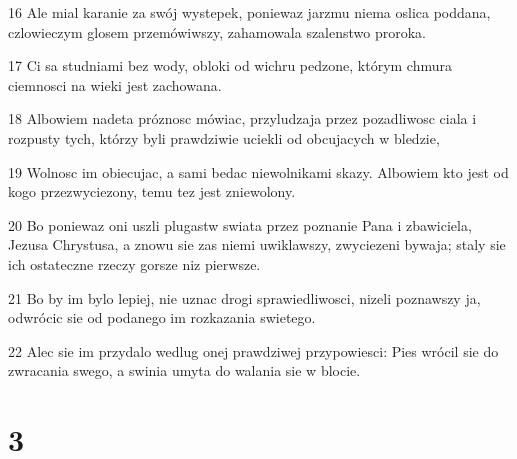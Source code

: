 \par 16 Ale mial karanie za swój wystepek, poniewaz jarzmu niema oslica poddana, czlowieczym glosem przemówiwszy, zahamowala szalenstwo proroka.
\par 17 Ci sa studniami bez wody, obloki od wichru pedzone, którym chmura ciemnosci na wieki jest zachowana.
\par 18 Albowiem nadeta próznosc mówiac, przyludzaja przez pozadliwosc ciala i rozpusty tych, którzy byli prawdziwie uciekli od obcujacych w bledzie,
\par 19 Wolnosc im obiecujac, a sami bedac niewolnikami skazy. Albowiem kto jest od kogo przezwyciezony, temu tez jest zniewolony.
\par 20 Bo poniewaz oni uszli plugastw swiata przez poznanie Pana i zbawiciela, Jezusa Chrystusa, a znowu sie zas niemi uwiklawszy, zwyciezeni bywaja; staly sie ich ostateczne rzeczy gorsze niz pierwsze.
\par 21 Bo by im bylo lepiej, nie uznac drogi sprawiedliwosci, nizeli poznawszy ja, odwrócic sie od podanego im rozkazania swietego.
\par 22 Alec sie im przydalo wedlug onej prawdziwej przypowiesci: Pies wrócil sie do zwracania swego, a swinia umyta do walania sie w blocie.

\chapter{3}

